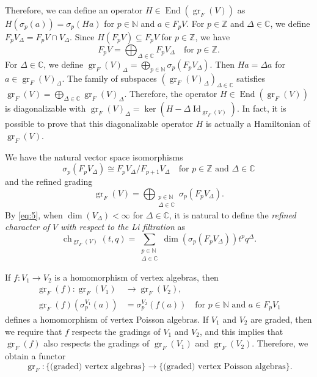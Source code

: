 \documentclass[a4paper, 12pt, reqno]{amsart}
\theoremstyle{remark}
\DeclareMathOperator{\ch}{ch}
\DeclareMathOperator{\gr}{gr}
\DeclareMathOperator{\End}{End}
\DeclareMathOperator{\Id}{Id}
\begin{document}
Therefore, we can define an operator $H \in \End(\gr_F(V))$ as $H(\sigma_p(a)) = \sigma_p(Ha)$ for $p \in \mathbb{N}$ and $a \in F_pV$.
For $p \in \mathbb{Z}$ and $\Delta \in \mathbb{C}$, we define $F_pV_{\Delta} = F_pV \cap V_{\Delta}$.
Since $H(F_pV) \subseteq F_pV$ for $p \in \mathbb{Z}$, we have
\begin{equation*}
  F_pV = \bigoplus_{\Delta \in \mathbb{C}}F_pV_{\Delta} \quad \text{for $p \in \mathbb{Z}$}.
\end{equation*}
For $\Delta \in \mathbb{C}$, we define $\gr_F(V)_{\Delta} = \bigoplus_{p \in \mathbb{N}}\sigma_p(F_pV_{\Delta})$.
Then $Ha = \Delta a$ for $a \in \gr_F(V)_{\Delta}$.
The family of subspaces $(\gr_F(V)_{\Delta})_{\Delta \in \mathbb{C}}$ satisfies $\gr_F(V) = \bigoplus_{\Delta \in \mathbb{C}}\gr_F(V)_{\Delta}$.
Therefore, the operator $H \in \End(\gr_F(V))$ is diagonalizable with $\gr_F(V)_{\Delta} = \ker(H - \Delta\Id_{\gr_F(V)})$.
In fact, it is possible to prove that this diagonalizable operator $H$ is actually a Hamiltonian of $\gr_F(V)$.

We have the natural vector space isomorphisms
\begin{equation*}
  \sigma_p(F_pV_{\Delta}) \cong F_pV_{\Delta}/F_{p + 1}V_{\Delta} \quad \text{for $p \in \mathbb{Z}$ and $\Delta \in \mathbb{C}$}
\end{equation*}
and the refined grading
\begin{equation}
  \label{eq:5}
  \gr_F(V) = \bigoplus_{\substack{p \in \mathbb{N} \\ \Delta \in \mathbb{C}}}\sigma_p(F_pV_{\Delta}).
\end{equation}
By \eqref{eq:5}, when $\dim(V_{\Delta}) < \infty$ for $\Delta \in \mathbb{C}$, it is natural to define the \emph{refined character of $V$ with respect to the Li filtration} as
\begin{equation*}
  \ch_{\gr_F(V)}(t, q) = \sum_{\substack{p \in \mathbb{N} \\ \Delta \in \mathbb{C}}}\dim(\sigma_p(F_pV_{\Delta}))t^pq^{\Delta}.
\end{equation*}

If $f: V_1 \to V_2$ is a homomorphism of vertex algebras, then
\begin{align*}
  \gr_F(f): \gr_F(V_1) &\to \gr_F(V_2), \\
  \gr_F(f)(\sigma^{V_1}_p(a)) &= \sigma^{V_2}_p(f(a)) \quad \text{for $p \in \mathbb{N}$ and $a \in F_pV_1$}
\end{align*}
defines a homomorphism of vertex Poisson algebras.
If $V_1$ and $V_2$ are graded, then we require that $f$ respects the gradings of $V_1$ and $V_2$, and this implies that $\gr_F(f)$ also respects the gradings of $\gr_F(V_1)$ and $\gr_F(V_2)$.
Therefore, we obtain a functor
\begin{equation*}
  \gr_F: \{\text{(graded) vertex algebras}\} \to \{\text{(graded) vertex Poisson algebras}\}.
\end{equation*}
\end{document}
